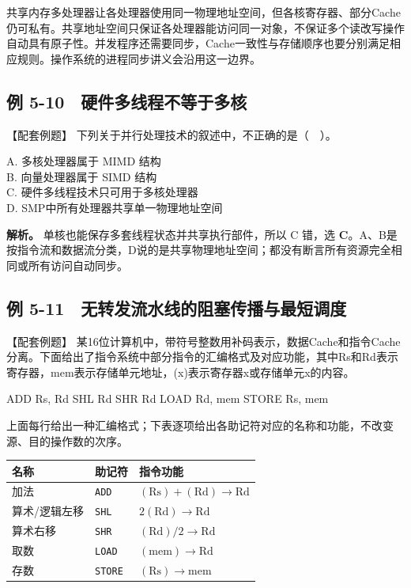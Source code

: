 共享内存多处理器让各处理器使用同一物理地址空间，但各核寄存器、部分Cache仍可私有。共享地址空间只保证各处理器能访问同一对象，不保证多个读改写操作自动具有原子性。并发程序还需要同步，Cache一致性与存储顺序也要分别满足相应规则。操作系统的进程同步讲义会沿用这一边界。

\subsection{例 5-10　硬件多线程不等于多核}\label{CO05-example-10}

【配套例题】 下列关于并行处理技术的叙述中，不正确的是（　）。

A. 多核处理器属于 MIMD 结构\\
B. 向量处理器属于 SIMD 结构\\
C. 硬件多线程技术只可用于多核处理器\\
D. SMP中所有处理器共享单一物理地址空间

\textbf{解析。} 单核也能保存多套线程状态并共享执行部件，所以 C 错，选 \textbf{C}。A、B是按指令流和数据流分类，D说的是共享物理地址空间；都没有断言所有资源完全相同或所有访问自动同步。

\subsection{例 5-11　无转发流水线的阻塞传播与最短调度}\label{CO05-example-11}

【配套例题】 某16位计算机中，带符号整数用补码表示，数据Cache和指令Cache分离。下面给出了指令系统中部分指令的汇编格式及对应功能，其中Rs和Rd表示寄存器，mem表示存储单元地址，(x)表示寄存器x或存储单元x的内容。

\begin{codeblock}[language={}]
ADD   Rs, Rd
SHL   Rd
SHR   Rd
LOAD  Rd, mem
STORE Rs, mem
\end{codeblock}

上面每行给出一种汇编格式；下表逐项给出各助记符对应的名称和功能，不改变源、目的操作数的次序。

\par\medskip\noindent\begin{minipage}{\linewidth}\fontsize{9.3}{12}\selectfont\begin{tabularx}{\linewidth}{@{}YYY@{}}
\toprule\noalign{}
名称 & 助记符 & 指令功能 \\
\midrule\noalign{}


加法 & \texttt{ADD} & \((\mathrm{Rs})+(\mathrm{Rd})\to\mathrm{Rd}\) \\
算术/逻辑左移 & \texttt{SHL} & \(2(\mathrm{Rd})\to\mathrm{Rd}\) \\
算术右移 & \texttt{SHR} & \((\mathrm{Rd})/2\to\mathrm{Rd}\) \\
取数 & \texttt{LOAD} & \((\mathrm{mem})\to\mathrm{Rd}\) \\
存数 & \texttt{STORE} & \((\mathrm{Rs})\to\mathrm{mem}\) \\
\bottomrule\end{tabularx}
\end{minipage}\par\medskip

